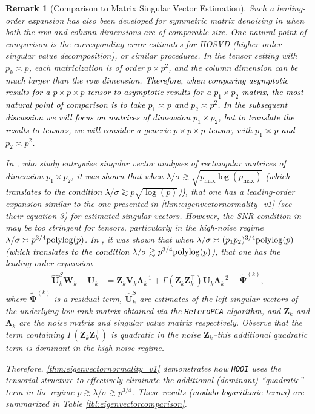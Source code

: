 \documentclass[10pt]{article}
\newcommand{\0}{{\mathbf{0}}}
\newcommand{\1}{{\mathbf{1}}}
\newcommand{\U}{{\mathbf{U}}}
\newcommand{\polylog}{{\rm polylog}}
\renewcommand{\citet}{\cite}
\renewcommand{\t}{^{\top}}
\newcommand{\uhat}{\mathbf{\hat{U}}}
\newtheorem{remark}{Remark}
\newcommand{\inv}{^{-1}}
\renewcommand{\tilde}{\widetilde}
\renewcommand{\hat}{\widehat}
\renewcommand{\hat}{\widehat}
\begin{document}
 
 \begin{remark}[Comparison to Matrix Singular Vector Estimation] \label{remark:snr}
 Such a leading-order expansion has also been developed for symmetric matrix denoising in  \citet{chen_spectral_2021} when both the row and column dimensions are of comparable size.  One natural point of comparison is the corresponding error estimates for HOSVD (higher-order singular value decomposition), or similar procedures.  In the tensor setting with $p_k \asymp p$, each matricization is of order $p \times p^2$, and the column dimension can be much larger than the row dimension.  \textcolor{black}{Therefore, when comparing asymptotic results for a $p \times p \times p$ tensor to asymptotic results for a $p_1 \times p_2$ matrix, the most natural point of comparison is to take $p_1 \asymp p$ and $p_2 \asymp p^2$.  In the subsequent discussion we will focus on matrices of dimension $p_1 \times p_2$, but to translate the results to tensors, we will consider a generic $p \times p \times p$ tensor, with $p_1 \asymp p$ and $p_2 \asymp p^2$.  }
 
 In \citet{agterberg_entrywise_2022}, who study entrywise singular vector analyses of rectangular matrices \textcolor{black}{of dimension $p_1 \times p_2$, it was shown that when $\lambda/\sigma \gtrsim \sqrt{p_{\max} \log(p_{\max})}$ (which translates to the condition $\lambda/\sigma \gtrsim p \sqrt{\log(p)}$))}, that one has a leading-order expansion similar to the one presented in \cref{thm:eigenvectornormality_v1} (see their equation 3) for estimated singular vectors.  However, the SNR condition in \citet{agterberg_entrywise_2022} may be too stringent for tensors, particularly in the high-noise regime $\lambda/\sigma \asymp p^{3/4} \polylog(p)$. In \citet{yan_inference_2021}, it was shown that when $\lambda/\sigma \asymp  (p_1 p_2)^{3/4}  \polylog(p)$ \textcolor{black}{(which translates to the condition $\lambda/\sigma \gtrsim p^{3/4} \polylog(p)$)}, that one has the leading-order expansion
 \begin{align*}
     \uhat_k^S \mathbf{W}_k - \U_k &= \mathbf{Z}_k \mathbf{V}_k \mathbf{\Lambda}_k\inv + \Gamma( \mathbf{Z}_k \mathbf{Z}_k\t ) \U_k \mathbf{\Lambda}_k^{-2} + \mathbf{\tilde \Psi}^{(k)},
 \end{align*}
 where $\mathbf{\tilde \Psi}^{(k)}$ is a residual term, $\uhat_k^S$ are estimates of the left singular vectors of the underlying low-rank matrix obtained via the \texttt{HeteroPCA} algorithm, and $\mathbf{Z}_k$ and $\mathbf{\Lambda}_k$ are the noise matrix and singular value matrix respectively. Observe that the term containing  $\Gamma(\mathbf{Z}_k \mathbf{Z}_k\t)$ is quadratic in the noise $\mathbf{Z}_k$--this additional quadratic term is dominant in the high-noise regime.    
 
 Therefore, \cref{thm:eigenvectornormality_v1} demonstrates how \texttt{HOOI} uses the tensorial structure to effectively eliminate the additional (dominant) ``quadratic'' term in the regime $p \gtrsim \lambda/\sigma \gtrsim p^{3/4}$.
 These results \textcolor{black}{(modulo logarithmic terms)} are summarized in Table \ref{tbl:eigenvectorcomparison}.
 \end{remark}
 
\end{document}
